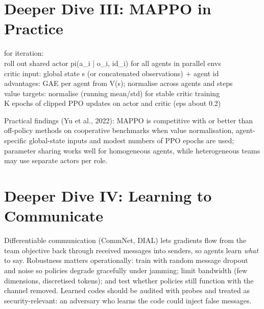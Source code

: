 \documentclass[11pt]{article}
\begin{document}
\section{Deeper Dive III: MAPPO in Practice}
\begin{center}\begin{minipage}{0.92\textwidth}\small\ttfamily
for iteration:\\
\hspace*{1em}roll out shared actor pi(a\_i | o\_i, id\_i) for all agents in parallel envs\\
\hspace*{1em}critic input: global state s (or concatenated observations) + agent id\\
\hspace*{1em}advantages: GAE per agent from V(s); normalise across agents and steps\\
\hspace*{1em}value targets: normalise (running mean/std) for stable critic training\\
\hspace*{1em}K epochs of clipped PPO updates on actor and critic (eps about 0.2)
\end{minipage}\end{center}
Practical findings (Yu et al., 2022): MAPPO is competitive with or better than off-policy methods on cooperative benchmarks when value normalisation, agent-specific global-state inputs and modest numbers of PPO epochs are used; parameter sharing works well for homogeneous agents, while heterogeneous teams may use separate actors per role.

\section{Deeper Dive IV: Learning to Communicate}
Differentiable communication (CommNet, DIAL) lets gradients flow from the team objective back through received messages into senders, so agents learn \emph{what} to say. Robustness matters operationally: train with random message dropout and noise so policies degrade gracefully under jamming; limit bandwidth (few dimensions, discretised tokens); and test whether policies still function with the channel removed. Learned codes should be audited with probes and treated as security-relevant: an adversary who learns the code could inject false messages.
\end{document}
